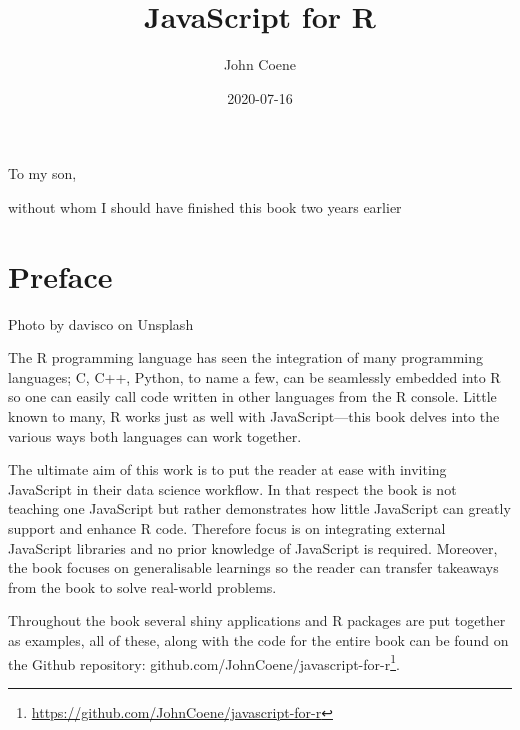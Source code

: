 \documentclass[
]{krantz}
\title{JavaScript for R}
\author{John Coene}
\date{2020-07-16}
\renewcommand{\href}[2]{#2\footnote{\url{#1}}}
\begin{document}
\maketitle


\thispagestyle{empty}

\begin{center}
To my son,

without whom I should have finished this book two years earlier
\end{center}

\setlength{\abovedisplayskip}{-5pt}
\setlength{\abovedisplayshortskip}{-5pt}

{
\hypersetup{linkcolor=}
\setcounter{tocdepth}{2}
\tableofcontents
}
\listoftables
\listoffigures
\hypertarget{preface}{%
\chapter*{Preface}\label{preface}}


{Photo by davisco on Unsplash}

The R programming language has seen the integration of many programming languages; C, C++, Python, to name a few, can be seamlessly embedded into R so one can easily call code written in other languages from the R console. Little known to many, R works just as well with JavaScript---this book delves into the various ways both languages can work together.

The ultimate aim of this work is to put the reader at ease with inviting JavaScript in their data science workflow. In that respect the book is not teaching one JavaScript but rather demonstrates how little JavaScript can greatly support and enhance R code. Therefore focus is on integrating external JavaScript libraries and no prior knowledge of JavaScript is required. Moreover, the book focuses on generalisable learnings so the reader can transfer takeaways from the book to solve real-world problems.

Throughout the book several shiny applications and R packages are put together as examples, all of these, along with the code for the entire book can be found on the Github repository: \href{https://github.com/JohnCoene/javascript-for-r}{github.com/JohnCoene/javascript-for-r}.
\end{document}
